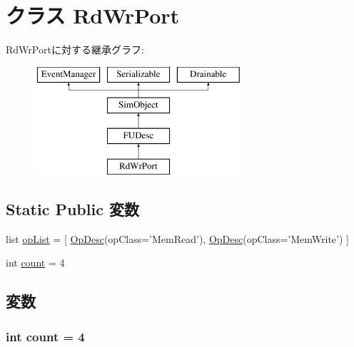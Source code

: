 \hypertarget{classFuncUnitConfig_1_1RdWrPort}{
\section{クラス RdWrPort}
\label{classFuncUnitConfig_1_1RdWrPort}
}
RdWrPortに対する継承グラフ:\begin{figure}[H]
\begin{center}
\leavevmode
\includegraphics[height=4cm]{classFuncUnitConfig_1_1RdWrPort}
\end{center}
\end{figure}
\subsection*{Static Public 変数}
\begin{DoxyCompactItemize}
\item 
list \hyperlink{classFuncUnitConfig_1_1RdWrPort_a31b2f9e3ac9a504397b140f513c469cc}{opList} = \mbox{[} \hyperlink{classOpDesc}{OpDesc}(opClass='MemRead'), \hyperlink{classOpDesc}{OpDesc}(opClass='MemWrite') \mbox{]}
\item 
int \hyperlink{classFuncUnitConfig_1_1RdWrPort_ad43c3812e6d13e0518d9f8b8f463ffcf}{count} = 4
\end{DoxyCompactItemize}


\subsection{変数}
\hypertarget{classFuncUnitConfig_1_1RdWrPort_ad43c3812e6d13e0518d9f8b8f463ffcf}{
\subsubsection[{count}]{\setlength{\rightskip}{0pt plus 5cm}int {\bf count} = 4}}
\label{classFuncUnitConfig_1_1RdWrPort_ad43c3812e6d13e0518d9f8b8f463ffcf}


